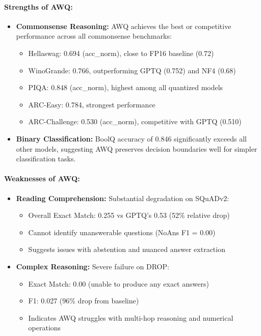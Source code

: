 \documentclass[11pt,a4paper]{article}
\begin{document}
\paragraph{Strengths of AWQ:}
\begin{itemize}
    \item \textbf{Commonsense Reasoning:} AWQ achieves the best or competitive performance across all commonsense benchmarks:
    \begin{itemize}
        \item Hellaswag: 0.694 (acc\_norm), close to FP16 baseline (0.72)
        \item WinoGrande: 0.766, outperforming GPTQ (0.752) and NF4 (0.68)
        \item PIQA: 0.848 (acc\_norm), highest among all quantized models
        \item ARC-Easy: 0.784, strongest performance
        \item ARC-Challenge: 0.530 (acc\_norm), competitive with GPTQ (0.510)
    \end{itemize}
    \item \textbf{Binary Classification:} BoolQ accuracy of 0.846 significantly exceeds all other models, suggesting AWQ preserves decision boundaries well for simpler classification tasks.
\end{itemize}

\paragraph{Weaknesses of AWQ:}
\begin{itemize}
    \item \textbf{Reading Comprehension:} Substantial degradation on SQuADv2:
    \begin{itemize}
        \item Overall Exact Match: 0.255 vs GPTQ's 0.53 (52\% relative drop)
        \item Cannot identify unanswerable questions (NoAns F1 = 0.00)
        \item Suggests issues with abstention and nuanced answer extraction
    \end{itemize}
    \item \textbf{Complex Reasoning:} Severe failure on DROP:
    \begin{itemize}
        \item Exact Match: 0.00 (unable to produce any exact answers)
        \item F1: 0.027 (96\% drop from baseline)
        \item Indicates AWQ struggles with multi-hop reasoning and numerical operations
    \end{itemize}
\end{itemize}
\end{document}
